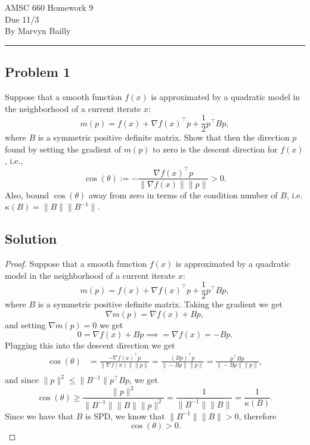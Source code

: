 \documentclass[12pt]{report}
\begin{document}
\large
\begin{center}
AMSC 660 Homework 9\\
Due 11/3\\
By Marvyn Bailly\\
\end{center}
\normalsize
\hrule




\begin{problem}%
\subsection*{Problem 1}

Suppose that a smooth function $f(x)$ is approximated by a quadratic model in the neighborhood of a current iterate $x$:
\[
     m(p) = f(x) + \nabla f(x)^\top p + \frac{1}{2}p^\top Bp,
\]
where $B$ is a symmetric positive definite matrix. Show that then the direction $p$ found by setting the gradient of $m(p)$ to zero is the descent direction for $f(x)$, i.e.,
\[
     \cos(\theta) := - \frac{\nabla f(x)^\top p}{\|\nabla f(x)\|\|p\|}>0.
\]
Also, bound $\cos(\theta)$ away from zero in terms of the condition number of $B$, i.e. $\kappa(B) = \|B\|\|B^{-1}\|.$

\subsection*{Solution}
\begin{proof}
Suppose that a smooth function $f(x)$ is approximated by a quadratic model in the neighborhood of a current iterate $x$:
\[
        m(p) = f(x) + \nabla f(x)^\top p + \frac{1}{2}p^\top Bp,
\]
where $B$ is a symmetric positive definite matrix. Taking the gradient we get
\[
     \nabla m(p) = \nabla f(x)+ Bp,
\]
and setting $\nabla m(p) = 0$ we get
\[
     0 = \nabla f(x)+ Bp \implies = \nabla f(x) = -Bp.
\]
Plugging this into the descent direction we get
\begin{align*}
    \cos(\theta) &= \frac{-\nabla f(x)^\top p}{\|\nabla f(x)\|\|p\|} =\frac{(Bp)^\top p}{\|-Bp\|\|p\|}= \frac{p^\top B p}{\|-Bp\|\|p\|},\\
\end{align*}
and since $\|p\|^2 \leq \|B^{-1}\|p^\top Bp$, we get
\[
    \cos(\theta) \geq \frac{\|p\|^2}{\|B^{-1}\|\|B\|\|p\|^2} = \frac{1}{\|B^{-1}\|\|B\|} = \frac{1}{\kappa(B)}.
\]
Since we have that $B$ is SPD, we know that $\|B^{-1}\|\|B\| > 0$, therefore
\[
     \cos(\theta) > 0.
\]


\end{proof}
\end{problem}
\end{document}
